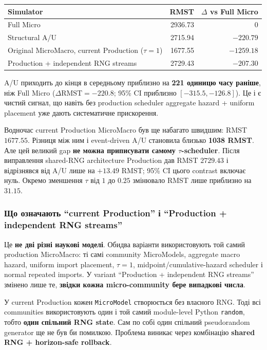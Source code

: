 \documentclass[11pt,a4paper]{article}
\begin{document}
\begin{center}
\begin{tabular}{l r r}
\toprule
\textbf{Simulator} & \textbf{RMST} & \textbf{$\Delta$ vs Full Micro}\\
\midrule
Full Micro & 2936.73 & 0\\
Structural A/U & 2715.94 & $-220.79$\\
Original MicroMacro, current Production ($\tau=1$) & 1677.55 & $-1259.18$\\
Production + independent RNG streams & 2729.43 & $-207.30$\\
\bottomrule
\end{tabular}
\end{center}

A/U приходить до кінця в середньому приблизно на \textbf{221 одиницю часу раніше}, ніж Full Micro ($\Delta\mathrm{RMST}=-220.8$; 95\% CI приблизно $[-315.5,-126.8]$). Це і є чистий сигнал, що навіть без production scheduler aggregate hazard + uniform placement уже дають систематичне прискорення.

Водночас current Production MicroMacro був ще набагато швидшим: RMST $1677.55$. Різниця між ним і event-driven A/U становила близько \textbf{1038 RMST}. Але цей великий gap \textbf{не можна приписувати самому $\tau$-scheduler}. Після виправлення shared-RNG architecture Production дав RMST $2729.43$ і відрізнявся від A/U лише на $+13.49$ RMST; 95\% CI цього contrast включає нуль. Окремо зменшення $\tau$ від $1$ до $0.25$ змінювало RMST лише приблизно на $31.15$.


\subsubsection*{Що означають ``current Production'' і ``Production + independent RNG streams''}

Це \textbf{не дві різні наукові моделі}. Обидва варіанти використовують той самий production MicroMacro: ті самі community MicroModels, aggregate macro hazard, uniform import placement, $\tau=1$, midpoint/cumulative-hazard scheduler і normal repeated imports. У variant ``Production + independent RNG streams'' змінено лише те, \textbf{звідки кожна micro-community бере випадкові числа}.

У current Production кожен \texttt{MicroModel} створюється без власного RNG. Тоді всі communities використовують один і той самий module-level Python \texttt{random}, тобто \textbf{один спільний RNG state}. Сам по собі один спільний pseudorandom generator ще не був би помилкою. Проблема виникає через комбінацію \textbf{shared RNG + horizon-safe rollback}.
\end{document}
